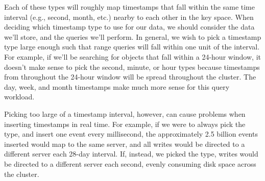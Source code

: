 Each of these types will roughly map timestamps that fall within the same time
interval (e.g., second, month, etc.) nearby to each other in the key space.
When deciding which timestamp type to use for our data, we should consider the
data we'll store, and the queries we'll perform.  In general, we wish to pick a
timestamp type large enough such that range queries will fall within one unit of
the interval.  For example, if we'll be searching for objects that fall within a
24-hour window, it doesn't make sense to pick the second, minute, or hour types
because timestamps from throughout the 24-hour window will be spread throughout
the cluster.  The day, week, and month timestamps make much more sense for this
query workload.

Picking too large of a timestamp interval, however, can cause problems when
inserting timestamps in real time.  For example, if we were to always pick the
 type, and insert one event every millisecond, the
approximately 2.5 billion events inserted would map to the same server, and all
writes would be directed to a different server each 28-day interval.  If,
instead, we picked the  type, writes would be directed
to a different server each second, evenly consuming disk space across the
cluster.
